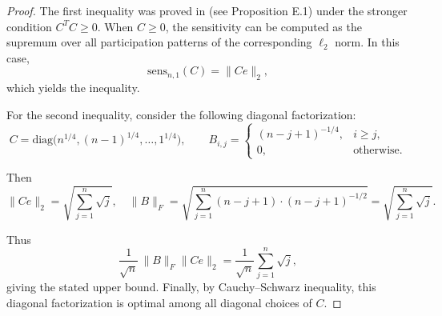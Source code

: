 \documentclass{article}
\theoremstyle{plain}
\theoremstyle{definition}
\theoremstyle{remark}
\begin{document}
\begin{proof}

The first inequality was proved in \citet{choquette2023amplified} (see Proposition E.1) under the stronger condition $C^T C \ge 0$.  
When $C \ge 0$, the sensitivity can be computed as the supremum over all participation patterns of the corresponding $\ell_2$ norm. In this case,
\begin{equation}
    \mathrm{sens}_{n,1}(C) = \|Ce\|_2,
\end{equation}
which yields the inequality.

For the second inequality, consider the following diagonal factorization:
\begin{equation}
    C = \mathrm{diag}\bigl(n^{1/4}, (n-1)^{1/4}, \ldots, 1^{1/4}\bigr),
    \qquad
    B_{i,j} = 
    \begin{cases}
        (n - j + 1)^{-1/4}, & i \ge j,\\[3pt]
        0, & \text{otherwise}.
    \end{cases}
\end{equation}

Then
\begin{equation}
    \|Ce\|_2 
    = \sqrt{\sum_{j=1}^{n} \sqrt{j}}, \quad
    \|B\|_F
    = \sqrt{
        \sum_{j=1}^{n} 
        (n - j + 1) \cdot (n - j + 1)^{-1/2}
    }
    =
    \sqrt{\sum_{j=1}^{n} \sqrt{j}}.
\end{equation}

Thus
\begin{equation}
    \frac{1}{\sqrt{n}} \, \|B\|_F \|Ce\|_2
    = 
    \frac{1}{\sqrt{n}} \sum_{j=1}^{n} \sqrt{j},
\end{equation}
giving the stated upper bound. Finally, by Cauchy--Schwarz inequality, this diagonal factorization is optimal among all diagonal choices of $C$.
\end{proof}



\NormalizedSensitivity*
\end{document}

